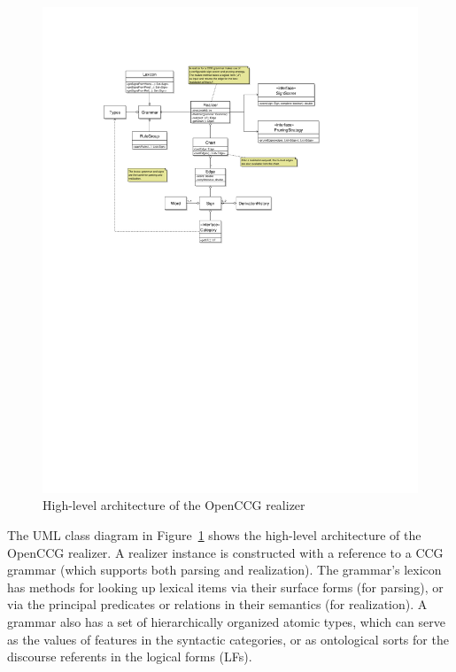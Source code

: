 \documentclass[11pt]{article}
\begin{document}
\begin{figure}%
\begin{center}
\mbox{}
\includegraphics[width=\textwidth]{realizer-class.pdf} 
\caption{High-level architecture of the OpenCCG realizer}
\label{realizer-class}
\end{center}
\end{figure}

The UML class diagram in Figure~\ref{realizer-class} shows the
high-level architecture of the OpenCCG realizer. A realizer
instance is constructed with a reference to a CCG grammar (which
supports both parsing and realization). The grammar's lexicon has
methods for looking up lexical items via their surface forms (for
parsing), or via the principal predicates or relations in their
semantics (for realization). A grammar also has a set of hierarchically
organized atomic types, which can serve as the values of features in the
syntactic categories, or as ontological sorts for the discourse
referents in the logical forms (LFs).
\end{document}
